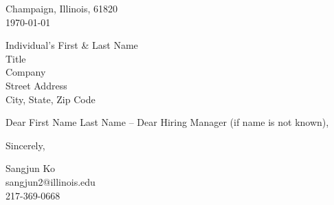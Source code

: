 \documentclass[11pt]{article}
\begin{document}
\noindent
Champaign, Illinois, 61820 \\
\today
\vspace{2em}

\noindent
Individual's First \& Last Name \\
Title \\
Company \\
Street Address \\
City, State, Zip Code

\vspace{1.5em}

Dear First Name Last Name -- Dear Hiring Manager (if name is not known),


\vspace{1em}

Sincerely,

\vspace{2em}

\noindent
Sangjun Ko\\
sangjun2@illinois.edu\\
217-369-0668
\end{document}
